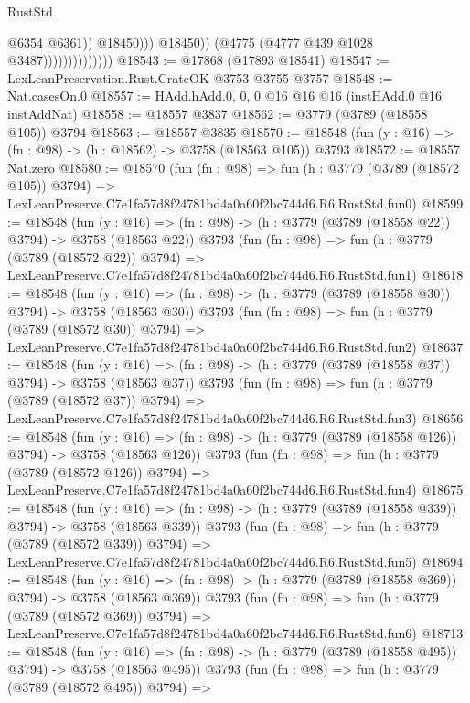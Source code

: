 \begin{lexlean}{RustStd}
\begin{coremodule}
                                          @6354
                                          @6361))
                                      @18450)))
                                @18450))
                            (@4775 (@4777 @439 @1028 @3487))))))))))))))
@18543 := @17868 (@17893 @18541)
@18547 := LexLeanPreservation.Rust.CrateOK @3753 @3755 @3757
@18548 := Nat.casesOn.{0}
@18557 := HAdd.hAdd.{0, 0, 0} @16 @16 @16 (instHAdd.{0} @16 instAddNat)
@18558 := @18557 @3837
@18562 := @3779 (@3789 (@18558 @105)) @3794
@18563 := @18557 @3835
@18570 := @18548 (fun (y : @16) => (fn : @98) -> (h : @18562) -> @3758 (@18563 @105)) @3793
@18572 := @18557 Nat.zero
@18580 := @18570
    (fun (fn : @98) =>
    fun (h : @3779 (@3789 (@18572 @105)) @3794) =>
    LexLeanPreserve.C7e1fa57d8f24781bd4a0a60f2bc744d6.R6.RustStd.fun0)
@18599 := @18548
    (fun (y : @16) => (fn : @98) -> (h : @3779 (@3789 (@18558 @22)) @3794) -> @3758 (@18563 @22))
    @3793
    (fun (fn : @98) =>
    fun (h : @3779 (@3789 (@18572 @22)) @3794) =>
    LexLeanPreserve.C7e1fa57d8f24781bd4a0a60f2bc744d6.R6.RustStd.fun1)
@18618 := @18548
    (fun (y : @16) => (fn : @98) -> (h : @3779 (@3789 (@18558 @30)) @3794) -> @3758 (@18563 @30))
    @3793
    (fun (fn : @98) =>
    fun (h : @3779 (@3789 (@18572 @30)) @3794) =>
    LexLeanPreserve.C7e1fa57d8f24781bd4a0a60f2bc744d6.R6.RustStd.fun2)
@18637 := @18548
    (fun (y : @16) => (fn : @98) -> (h : @3779 (@3789 (@18558 @37)) @3794) -> @3758 (@18563 @37))
    @3793
    (fun (fn : @98) =>
    fun (h : @3779 (@3789 (@18572 @37)) @3794) =>
    LexLeanPreserve.C7e1fa57d8f24781bd4a0a60f2bc744d6.R6.RustStd.fun3)
@18656 := @18548
    (fun (y : @16) => (fn : @98) -> (h : @3779 (@3789 (@18558 @126)) @3794) -> @3758 (@18563 @126))
    @3793
    (fun (fn : @98) =>
    fun (h : @3779 (@3789 (@18572 @126)) @3794) =>
    LexLeanPreserve.C7e1fa57d8f24781bd4a0a60f2bc744d6.R6.RustStd.fun4)
@18675 := @18548
    (fun (y : @16) => (fn : @98) -> (h : @3779 (@3789 (@18558 @339)) @3794) -> @3758 (@18563 @339))
    @3793
    (fun (fn : @98) =>
    fun (h : @3779 (@3789 (@18572 @339)) @3794) =>
    LexLeanPreserve.C7e1fa57d8f24781bd4a0a60f2bc744d6.R6.RustStd.fun5)
@18694 := @18548
    (fun (y : @16) => (fn : @98) -> (h : @3779 (@3789 (@18558 @369)) @3794) -> @3758 (@18563 @369))
    @3793
    (fun (fn : @98) =>
    fun (h : @3779 (@3789 (@18572 @369)) @3794) =>
    LexLeanPreserve.C7e1fa57d8f24781bd4a0a60f2bc744d6.R6.RustStd.fun6)
@18713 := @18548
    (fun (y : @16) => (fn : @98) -> (h : @3779 (@3789 (@18558 @495)) @3794) -> @3758 (@18563 @495))
    @3793
    (fun (fn : @98) =>
    fun (h : @3779 (@3789 (@18572 @495)) @3794) =>

\end{coremodule}
\end{lexlean}
